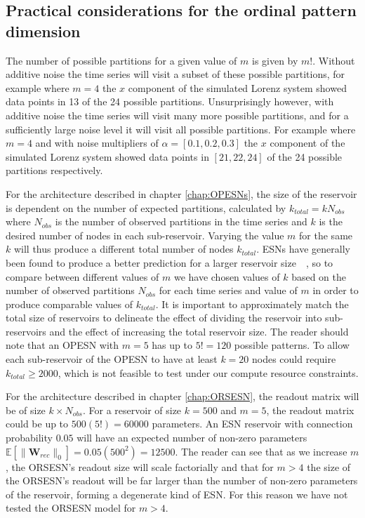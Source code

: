 \subsection{Practical considerations for the ordinal pattern dimension}

The number of possible partitions for a given value of $m$ is given by $m!$. Without additive noise the time series will visit a subset of these possible partitions, for example where $m=4$ the $x$ component of the simulated Lorenz system showed data points in 13 of the 24 possible partitions. Unsurprisingly however, with additive noise the time series will visit many more possible partitions, and for a sufficiently large noise level it will visit all possible partitions. For example where $m=4$ and with noise multipliers of $\alpha=[0.1, 0.2, 0.3]$ the $x$ component of the simulated Lorenz system showed data points in $[21, 22, 24]$ of the 24 possible partitions respectively.

For the architecture described in chapter \ref{chap:OPESNs}, the size of the reservoir is dependent on the number of expected partitions, calculated by $k_{total}=kN_{obs}$ where $N_{obs}$ is the number of observed partitions in the time series and $k$ is the desired number of nodes in each sub-reservoir. Varying the value $m$ for the same $k$ will thus produce a different total number of nodes $k_{total}$. ESNs have generally been found to produce a better prediction for a larger reservoir size~\cite{lukosevicius_and_jaeger_2009}~\cite{lukosevicius_2012_practical_guide}, so to compare between different values of $m$ we have chosen values of $k$ based on the number of observed partitions $N_{obs}$ for each time series and value of $m$ in order to produce comparable values of $k_{total}$. It is important to approximately match the total size of reservoirs to delineate the effect of dividing the reservoir into sub-reservoirs and the effect of increasing the total reservoir size. The reader should note that an OPESN with $m=5$ has up to $5!=120$ possible patterns. To allow each sub-reservoir of the OPESN to have at least $k=20$ nodes could require $k_{total} \geq 2000$, which is not feasible to test under our compute resource constraints.

For the architecture described in chapter \ref{chap:ORSESN}, the readout matrix will be of size $k \times N_{obs}$. For a reservoir of size $k=500$ and $m=5$, the readout matrix could be up to $500(5!)=60000$ parameters. An ESN reservoir with connection probability $0.05$ will have an expected number of non-zero parameters $\mathbb{E}[\|\mathbf{W}_{rec}\|_0] = 0.05(500^2) = 12500$. The reader can see that as we increase $m$, the ORSESN's readout size will scale factorially and that for $m>4$ the size of the ORSESN's readout will be far larger than the number of non-zero parameters of the reservoir, forming a degenerate kind of ESN. For this reason we have not tested the ORSESN model for $m>4$.

